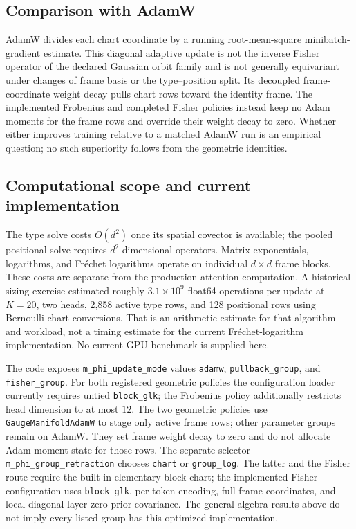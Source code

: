 \documentclass[11pt]{article}
\theoremstyle{definition}
\theoremstyle{remark}
\begin{document}
\subsection{Comparison with AdamW}\label{frame:sec:adamw}

AdamW \cite{frame:KingmaBa2015,frame:LoshchilovHutter2019} divides each chart coordinate by a running root-mean-square minibatch-gradient estimate. This diagonal adaptive update is not the inverse Fisher operator of the declared Gaussian orbit family and is not generally equivariant under changes of frame basis or the type--position split. Its decoupled frame-coordinate weight decay pulls chart rows toward the identity frame. The implemented Frobenius and completed Fisher policies instead keep no Adam moments for the frame rows and override their weight decay to zero. Whether either improves training relative to a matched AdamW run is an empirical question; no such superiority follows from the geometric identities.

\subsection{Computational scope and current implementation}\label{frame:sec:implementation}
The type solve costs \(O(d^2)\) once its spatial covector is available; the pooled positional solve requires \(d^2\)-dimensional operators. Matrix exponentials, logarithms, and Fr\'echet logarithms operate on individual \(d\times d\) frame blocks. These costs are separate from the production attention computation. A historical sizing exercise estimated roughly \(3.1\times10^9\) float64 operations per update at \(K=20\), two heads, 2,858 active type rows, and 128 positional rows using Bernoulli chart conversions. That is an arithmetic estimate for that algorithm and workload, not a timing estimate for the current Fr\'echet-logarithm implementation. No current GPU benchmark is supplied here.

The code exposes \texttt{m\_phi\_update\_mode} values \texttt{adamw}, \texttt{pullback\_group}, and \texttt{fisher\_group}. For both registered geometric policies the configuration loader currently requires untied \texttt{block\_glk}; the Frobenius policy additionally restricts head dimension to at most $12$. The two geometric policies use \texttt{GaugeManifoldAdamW} to stage only active frame rows; other parameter groups remain on AdamW. They set frame weight decay to zero and do not allocate Adam moment state for those rows. The separate selector \texttt{m\_phi\_group\_retraction} chooses \texttt{chart} or \texttt{group\_log}. The latter and the Fisher route require the built-in elementary block chart; the implemented Fisher configuration uses \texttt{block\_glk}, per-token encoding, full frame coordinates, and local diagonal layer-zero prior covariance. The general algebra results above do not imply every listed group has this optimized implementation.
\end{document}
